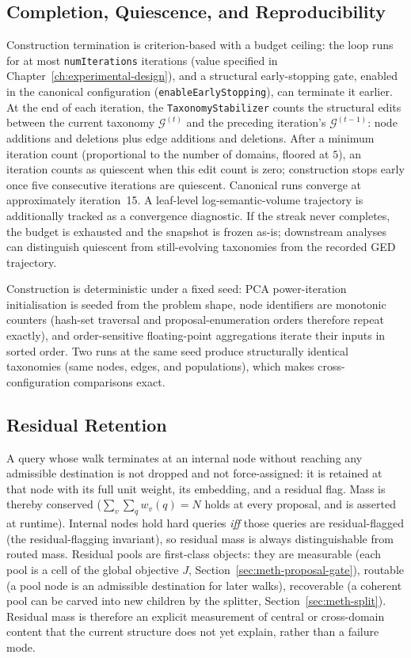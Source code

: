 \subsection{Completion, Quiescence, and Reproducibility}\label{subsec:quiescence}

Construction termination is criterion-based with a budget ceiling:
the loop runs for at most \texttt{numIterations} iterations (value
specified in Chapter~\ref{ch:experimental-design}), and a structural
early-stopping gate, enabled in the canonical configuration
(\texttt{enableEarlyStopping}), can terminate it earlier.
At the end of each iteration, the \texttt{TaxonomyStabilizer} counts
the structural edits between the current taxonomy $\mathcal{G}^{(t)}$
and the preceding iteration's $\mathcal{G}^{(t-1)}$: node additions and
deletions plus edge additions and deletions.
After a minimum iteration count (proportional to the number of
domains, floored at $5$), an iteration counts as quiescent when this
edit count is zero; construction stops early once five consecutive
iterations are quiescent.
Canonical runs converge at approximately iteration~15.
A leaf-level log-semantic-volume trajectory is additionally tracked as
a convergence diagnostic.
If the streak never completes, the budget is exhausted and the
snapshot is frozen as-is; downstream analyses can distinguish
quiescent from still-evolving taxonomies from the recorded GED
trajectory.

Construction is deterministic under a fixed seed: PCA power-iteration
initialisation is seeded from the problem shape, node identifiers are
monotonic counters (hash-set traversal and proposal-enumeration
orders therefore repeat exactly), and order-sensitive floating-point
aggregations iterate their inputs in sorted order.
Two runs at the same seed produce structurally identical taxonomies
(same nodes, edges, and populations), which makes cross-configuration
comparisons exact.

\subsection{Residual Retention}\label{subsec:residuals}

A query whose walk terminates at an internal node without reaching
any admissible destination is not dropped and not force-assigned: it
is retained at that node with its full unit weight, its embedding,
and a residual flag.
Mass is thereby conserved ($\sum_v \sum_q w_v(q) = N$ holds at every
proposal, and is asserted at runtime).
Internal nodes hold hard queries \emph{iff} those queries are
residual-flagged (the residual-flagging invariant), so residual mass is always
distinguishable from routed mass.
Residual pools are first-class objects: they are measurable (each
pool is a cell of the global objective $J$,
Section~\ref{sec:meth-proposal-gate}), routable (a pool node is an
admissible destination for later walks), recoverable (a coherent pool
can be carved into new children by the splitter,
Section~\ref{sec:meth-split}).
Residual mass is therefore an explicit measurement of
central or cross-domain content that the current structure does not
yet explain, rather than a failure mode.

